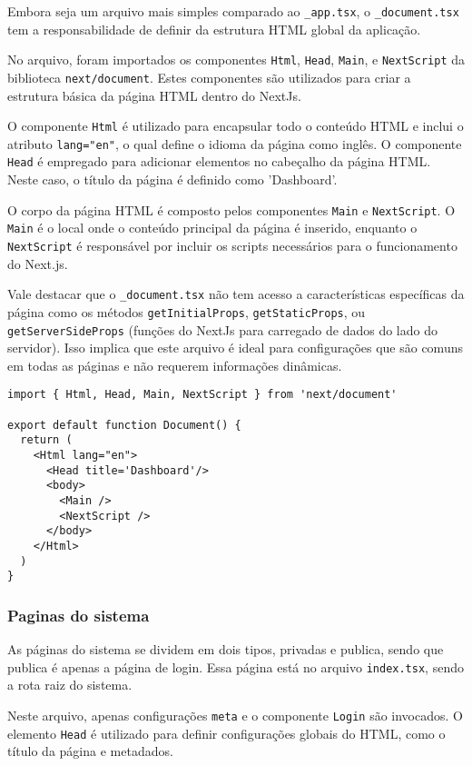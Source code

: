 Embora seja um arquivo mais simples comparado ao \texttt{\_app.tsx}, o \texttt{\_document.tsx} tem a responsabilidade de definir da estrutura HTML global da aplicação.

No arquivo, foram importados os componentes \texttt{Html}, \texttt{Head}, \texttt{Main}, e \texttt{NextScript} da biblioteca \texttt{next/document}. Estes componentes são utilizados para criar a estrutura básica da página HTML dentro do NextJs.

O componente \texttt{Html} é utilizado para encapsular todo o conteúdo HTML e inclui o atributo \texttt{lang="en"}, o qual define o idioma da página como inglês. O componente \texttt{Head} é empregado para adicionar elementos no cabeçalho da página HTML. Neste caso, o título da página é definido como 'Dashboard'.

O corpo da página HTML é composto pelos componentes \texttt{Main} e \texttt{NextScript}. O \texttt{Main} é o local onde o conteúdo principal da página é inserido, enquanto o \texttt{NextScript} é responsável por incluir os scripts necessários para o funcionamento do Next.js.

Vale destacar que o \texttt{\_document.tsx} não tem acesso a características específicas da página como os métodos \texttt{getInitialProps}, \texttt{getStaticProps}, ou \texttt{getServerSideProps} (funções do NextJs para carregado de dados do lado do servidor). Isso implica que este arquivo é ideal para configurações que são comuns em todas as páginas e não requerem informações dinâmicas.

\begin{verbatim}
import { Html, Head, Main, NextScript } from 'next/document'

export default function Document() {
  return (
    <Html lang="en">
      <Head title='Dashboard'/>
      <body>
        <Main />
        <NextScript />
      </body>
    </Html>
  )
}
\end{verbatim}

\subsubsection{Paginas do sistema}\label{subsec:}
As páginas do sistema se dividem em dois tipos, privadas e publica, sendo que publica é apenas a página de login. Essa página está no arquivo \texttt{index.tsx}, sendo a rota raiz do sistema. 

Neste arquivo, apenas configurações \texttt{meta} e o componente \texttt{Login} são invocados. O elemento \texttt{Head} é utilizado para definir configurações globais do HTML, como o título da página e metadados. 

